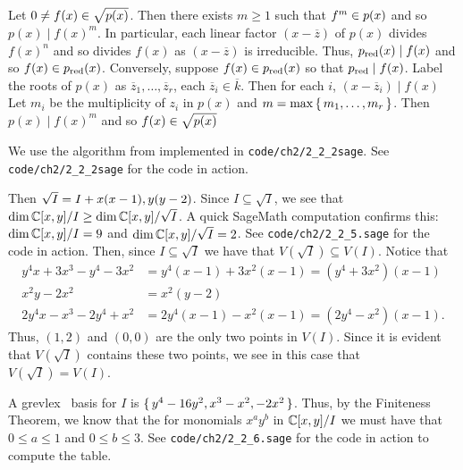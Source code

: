 \documentclass[letterpaper, 11pt, oneside]{book}
\begin{document}
\begin{sol}\label{ex:UAG_2.2.3}
  Let $0 \neq f(x) \in \sqrt{\gen{p(x)}}$.
  Then there exists $m \geq 1$ such that $f^{m} \in \gen{p(x)}$ and so $p(x) \mid f(x)^{m}$.
  In particular, each linear factor $(x - \overline{z})$ of $p(x)$ divides $f(x)^{n}$ and so divides $f(x)$ as $(x - \overline{z})$ is irreducible.
  Thus, $p_{\operatorname{red}}(x) \mid f(x)$ and so $f(x) \in \gen{p_{\red}(x)}$.
  Conversely, suppose $f(x) \in \gen{p_{\red}(x)}$ so that $\gen{p_{\red}} \mid f(x)$.
  Label the roots of $p(x)$ as $\overline{z}_{1}, \ldots, \overline{z}_{r}$, each $\overline{z}_{i} \in \overline{k}$.
  Then for each $i$, $(x - \overline{z}_{i}) \mid f(x)$
  Let $m_{i}$ be the multiplicity of $z_{i}$ in $p(x)$ and $m = \max\set{m_{1}, \ldots, m_{r}}$.
  Then $p(x) \mid f(x)^{m}$ and so $f(x) \in \sqrt{\gen{p(x)}}$
\end{sol}

\begin{sol}\label{ex:UAG_2.2.4}
  We use the algorithm from  implemented in \texttt{code/ch2/2\_2\_2sage}.
  See \texttt{code/ch2/2\_2\_2sage} for the code in action.
\end{sol}

\clearpage

\begin{sol}\label{ex:UAG_2.2.5}
  Then $\sqrt{I} = I + \gen{x(x - 1), y(y - 2)}$.
  Since $I \subseteq \sqrt{I}$, we see that $\dim \mathbb{C}[x, y] / I \geq \dim \mathbb{C}[x, y] / \sqrt{I}$.
  A quick SageMath computation confirms this: $\dim \mathbb{C}[x, y] / I = 9$ and $\dim \mathbb{C}[x, y] / \sqrt{I} = 2$.
  See \texttt{code/ch2/2\_2\_5.sage} for the code in action.
  Then, since $I \subseteq \sqrt{I}$ we have that $V(\sqrt{I}) \subseteq V(I)$.
  Notice that
  \begin{align*}
    y^{4}x + 3x^{3} - y^{4} - 3x^{2} &= y^{4}(x - 1) + 3x^{2}(x - 1) = (y^{4} + 3x^{2})(x - 1) \\
    x^{2}y - 2x^{2} &= x^{2}(y - 2) \\
    2y^{4}x - x^{3} - 2y^{4} + x^{2} &= 2y^{4}(x - 1) - x^{2}(x - 1) = (2y^{4} - x^{2})(x - 1).
  \end{align*}
  Thus, $(1, 2)$ and $(0, 0)$ are the only two points in $V(I)$.
  Since it is evident that $V(\sqrt{I})$ contains these two points, we see in this case that $V(\sqrt{I}) = V(I)$.
\end{sol}

\begin{sol}\label{ex:UAG_2.2.6}
  A grevlex \Grobner\ basis for $I$ is $\set{y^{4} - 16y^{2}, x^{3} - x^{2}, -2x^{2}}$.
  Thus, by the Finiteness Theorem, we know that the for monomials $x^{a}y^{b}$ in $\mathbb{C}[x, y] / I$ we must have that $0 \leq a \leq 1$ and $0 \leq b \leq 3$.
  See \texttt{code/ch2/2\_2\_6.sage} for the code in action to compute the table.
\end{sol}
\end{document}
